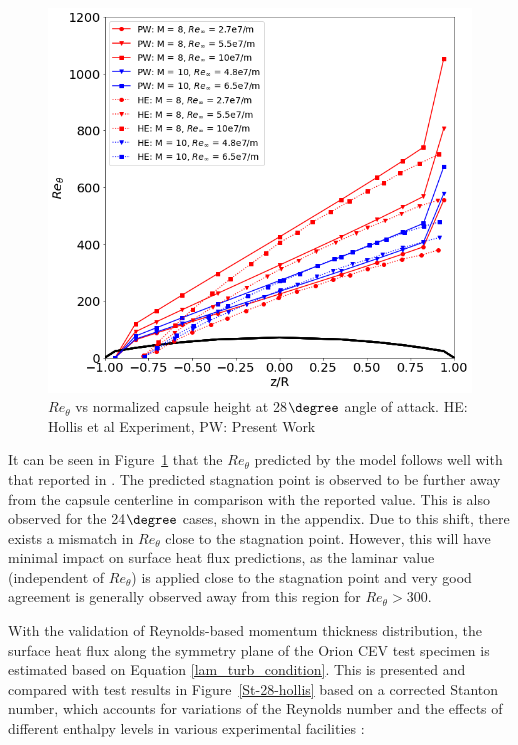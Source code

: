 \documentclass[%
 aip,
 amsmath,amssymb,
preprint,%
]{revtex4-1}
\begin{document}
\begin{figure}[h!]
\centering
\includegraphics[width=0.7\linewidth]{Re-28-hollis.png}
\caption{$Re_\theta$ vs normalized capsule height at 28$\degree$ angle of attack. HE: Hollis et al Experiment, PW: Present Work}
\label{Re-28-hollis}
\end{figure}

It can be seen in Figure~\ref{Re-28-hollis} that the $Re_\theta$ predicted by the model follows well with that reported in \cite{hollis_aeroheating_2009}. The predicted stagnation point is observed to be further away from the capsule centerline in comparison with the reported value. This is also observed for the 24$\degree$ cases, shown in the appendix. Due to this shift, there exists a mismatch in $Re_\theta$ close to the stagnation point. However, this will have minimal impact on surface heat flux predictions, as the laminar value (independent of $Re_\theta$) is applied close to the stagnation point and very good agreement is generally observed away from this region for $Re_\theta > 300$. 

With the validation of Reynolds-based momentum thickness distribution, the surface heat flux along the symmetry plane of the Orion CEV test specimen is estimated based on Equation \eqref{lam_turb_condition}. This is presented and compared with test results in Figure~\ref{St-28-hollis} based on a corrected Stanton number, which accounts for variations of the Reynolds number and the effects of different enthalpy levels in various experimental facilities \citep{hollis_aeroheating_2009}:
\end{document}

